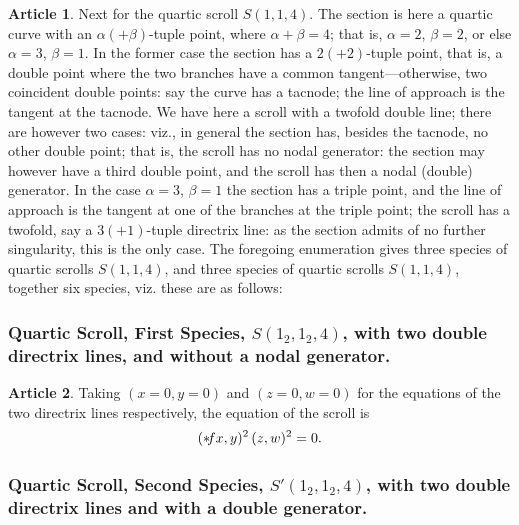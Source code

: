 \documentclass[12pt,a4paper]{article}
\theoremstyle{definition}
\newtheorem{art}{Article}[section]
\begin{document}
\begin{art}
Next for the quartic scroll $S(1, 1, 4)$. The section is here a quartic curve with an $\alpha (+ \beta)$-tuple point, where $\alpha + \beta = 4$; that is, $\alpha = 2$, $\beta = 2$, or else $\alpha = 3$, $\beta = 1$. In the former case the section has a $2 (+ 2)$-tuple point, that is, a double point where the two branches have a common tangent---otherwise, two coincident double points: say the curve has a tacnode; the line of approach is the tangent at the tacnode. We have here a scroll with a twofold double line; there are however two cases: viz., in general the section has, besides the tacnode, no other double point; that is, the scroll has no nodal generator: the section may however have a third double point, and the scroll has then a nodal (double) generator. In the case $\alpha = 3$, $\beta = 1$ the section has a triple point, and the line of approach is the tangent at one of the branches at the triple point; the scroll has a twofold, say a $3 (+ 1)$-tuple directrix line: as the section admits of no further singularity, this is the only case. The foregoing enumeration gives three species of quartic scrolls $S(1, 1, 4)$, and three species of quartic scrolls $S(1, 1, 4)$, together six species, viz. these are as follows:
\end{art}

\subsubsection*{Quartic Scroll, First Species, $S(1_2, 1_2, 4)$, with two double directrix lines, and without a nodal generator.}

\begin{art}
Taking $(x = 0, y = 0)$ and $(z = 0, w = 0)$ for the equations of the two directrix lines respectively, the equation of the scroll is
\[
(* \hspace{-2pt} fx, y)^2 \, (z, w)^2 = 0.
\]
\end{art}

\subsubsection*{Quartic Scroll, Second Species, $S'(1_2, 1_2, 4)$, with two double directrix lines and with a double generator.}
\end{document}
